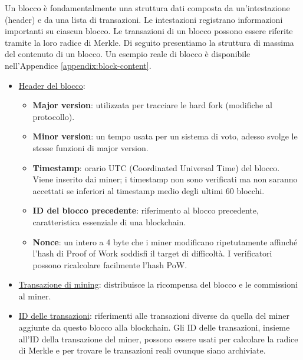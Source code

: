 Un blocco è fondamentalmente una struttura dati composta da un'intestazione (header) e da una lista di transazioni. Le intestazioni registrano informazioni importanti su ciascun blocco. Le transazioni di un blocco possono essere riferite tramite la loro radice di Merkle. Di seguito presentiamo la struttura di massima del contenuto di un blocco. Un esempio reale di blocco è disponibile nell'Appendice \ref{appendix:block-content}.
\begin{itemize}
\item \underline{Header del blocco}:
\begin{itemize}
\item \textbf{Major version}: utilizzata per tracciare le hard fork (modifiche al protocollo).
\item \textbf{Minor version}: un tempo usata per un sistema di voto, adesso svolge le stesse funzioni di major version.
\item \textbf{Timestamp}: orario UTC (Coordinated Universal Time) del blocco. Viene inserito dai miner; i timestamp non sono verificati ma non saranno accettati se inferiori al timestamp medio degli ultimi 60 blocchi.
\item \textbf{ID del blocco precedente}: riferimento al blocco precedente, caratteristica essenziale di una blockchain.
\item \textbf{Nonce}: un intero a 4 byte che i miner modificano ripetutamente affinché l’hash di Proof of Work soddisfi il target di difficoltà. I verificatori possono ricalcolare facilmente l’hash PoW.
\end{itemize}
\item \underline{Transazione di mining}: distribuisce la ricompensa del blocco e le commissioni al miner.
\item \underline{ID delle transazioni}: riferimenti alle transazioni diverse da quella del miner aggiunte da questo blocco alla blockchain. Gli ID delle transazioni, insieme all’ID della transazione del miner, possono essere usati per calcolare la radice di Merkle e per trovare le transazioni reali ovunque siano archiviate.
\end{itemize}\vspace{.05cm}

